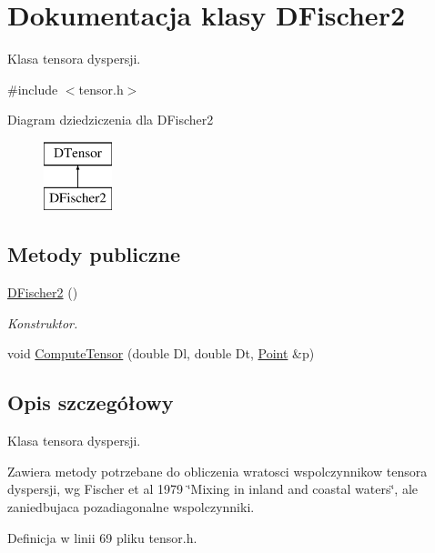 \hypertarget{class_d_fischer2}{}\section{Dokumentacja klasy D\+Fischer2}
\label{class_d_fischer2}


Klasa tensora dyspersji.  




{\ttfamily \#include $<$tensor.\+h$>$}

Diagram dziedziczenia dla D\+Fischer2\begin{figure}[H]
\begin{center}
\leavevmode
\includegraphics[height=2.000000cm]{class_d_fischer2}
\end{center}
\end{figure}
\subsection*{Metody publiczne}
\begin{DoxyCompactItemize}
\item 
\hyperlink{class_d_fischer2_afa71f15373ca57859ab3f09ec3306bde}{D\+Fischer2} ()
\begin{DoxyCompactList}\small\item\em Konstruktor. \end{DoxyCompactList}\item 
void \hyperlink{class_d_fischer2_ae9c984ac693b39d8ea947aaa975cb0d7}{Compute\+Tensor} (double Dl, double Dt, \hyperlink{class_point}{Point} \&p)
\end{DoxyCompactItemize}


\subsection{Opis szczegółowy}
Klasa tensora dyspersji. 

Zawiera metody potrzebane do obliczenia wratosci wspolczynnikow tensora dyspersji, wg Fischer et al 1979 \char`\"{}\+Mixing in inland and coastal waters\char`\"{}, ale zaniedbujaca pozadiagonalne wspolczynniki. 

Definicja w linii 69 pliku tensor.\+h.




